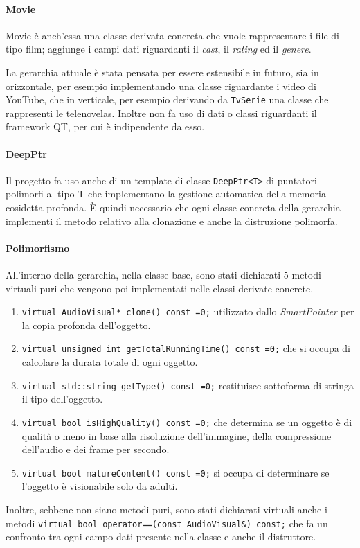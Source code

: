 \paragraph{Movie}
Movie è anch'essa una classe derivata concreta che vuole rappresentare i file di tipo film; aggiunge i campi dati riguardanti il \textit{cast}, il \textit{rating} ed il \textit{genere}. \newline

La gerarchia attuale è stata pensata per essere estensibile in futuro, sia in orizzontale, per esempio implementando una classe riguardante i video di YouTube, che in verticale, per esempio derivando da \texttt{TvSerie} una classe che rappresenti le telenovelas. \newline
Inoltre non fa uso di dati o classi riguardanti il framework QT, per cui è indipendente da esso.

\paragraph{DeepPtr}
Il progetto fa uso anche di un template di classe \texttt{DeepPtr<T>} di puntatori polimorfi al tipo T che implementano la gestione automatica della memoria cosidetta profonda. È quindi necessario che ogni classe concreta della gerarchia implementi il metodo relativo alla clonazione e anche la distruzione polimorfa.

\paragraph{Polimorfismo}
All'interno della gerarchia, nella classe base, sono stati dichiarati 5 metodi virtuali puri che vengono poi implementati nelle classi derivate concrete. 
\begin{enumerate}
    \item \texttt{virtual AudioVisual* clone() const =0;} utilizzato dallo \textit{SmartPointer} per la copia profonda dell'oggetto.
    \item \texttt{virtual unsigned int getTotalRunningTime() const =0;} che si occupa di calcolare la durata totale di ogni oggetto.
    \item \texttt{virtual std::string getType() const =0;} restituisce sottoforma di stringa il tipo dell'oggetto.
    \item \texttt{virtual bool isHighQuality() const =0;} che determina se un oggetto è di qualità o meno in base alla risoluzione dell'immagine, della compressione dell'audio e dei frame per secondo.
    \item \texttt{virtual bool matureContent() const =0;} si occupa di determinare se l'oggetto è visionabile solo da adulti.
\end{enumerate}
Inoltre, sebbene non siano metodi puri, sono stati dichiarati virtuali anche i metodi \texttt{virtual bool operator==(const AudioVisual\&) const;} che fa un confronto tra ogni campo dati presente nella classe e anche il distruttore.




